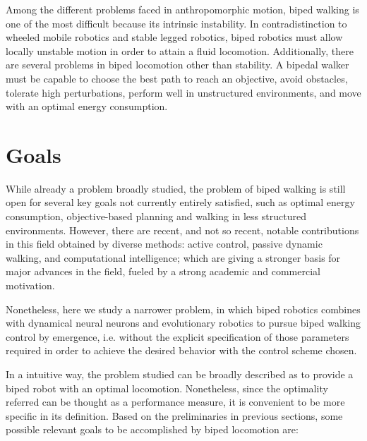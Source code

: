 Among the different problems faced in anthropomorphic motion, biped
walking is one of the most difficult because its intrinsic
instability. In contradistinction to wheeled mobile robotics and
stable legged robotics, biped robotics must allow locally unstable
motion in order to attain a fluid locomotion. Additionally, there are
several problems in biped locomotion other than stability. A bipedal
walker must be capable to choose the best path to reach an objective,
avoid obstacles, tolerate high perturbations, perform well in
unstructured environments, and move with an optimal energy
consumption.

\section{Goals}

While already a problem broadly studied, the problem of biped walking
is still open for several key goals not currently entirely satisfied,
such as optimal energy consumption, objective-based planning and
walking in less structured environments. However, there are recent,
and not so recent, notable contributions in this field obtained by
diverse methods: active control, passive dynamic walking, and
computational intelligence; which are giving a stronger basis for
major advances in the field, fueled by a strong academic and
commercial motivation.

Nonetheless, here we study a narrower problem, in which biped robotics
combines with dynamical neural neurons and evolutionary robotics to
pursue biped walking control by emergence, i.e. without the explicit
specification of those parameters required in order to achieve the
desired behavior with the control scheme chosen.

In a intuitive way, the problem studied can be broadly described as to
provide a biped robot with an optimal locomotion. Nonetheless, since
the optimality referred can be thought as a performance measure, it is
convenient to be more specific in its definition. Based on the
preliminaries in previous sections, some possible relevant goals to be
accomplished by biped locomotion are:

